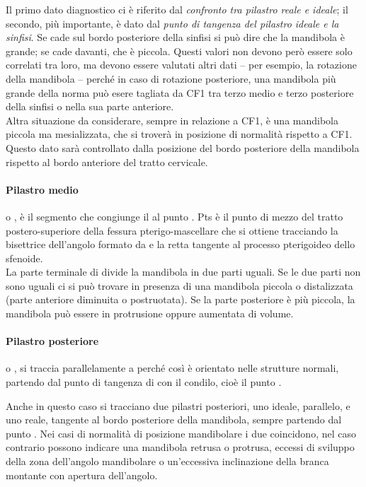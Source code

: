 Il primo dato diagnostico ci è riferito dal \emph{confronto tra pilastro reale e ideale}; il secondo, più importante, è dato dal \emph{punto di tangenza del pilastro ideale e la sinfisi}. Se cade sul bordo posteriore della sinfisi si può dire che la mandibola è grande; se cade davanti, che è piccola. Questi valori non devono però essere solo correlati tra loro, ma devono essere valutati altri dati -- per esempio, la rotazione della mandibola -- perché in caso di rotazione posteriore, una mandibola più grande della norma può esere tagliata da CF1 tra terzo medio e terzo posteriore della sinfisi o nella sua parte anteriore.\\

Altra situazione da considerare, sempre in relazione a CF1, è una mandibola piccola ma mesializzata, che si troverà in posizione di normalità rispetto a CF1. Questo dato sarà controllato dalla posizione del bordo posteriore della mandibola rispetto al bordo anteriore del tratto cervicale.

\paragraph{Pilastro medio} o , è il segmento che congiunge il  al punto . Pts è il punto di mezzo del tratto postero-superiore della fessura pterigo-mascellare che si ottiene tracciando la bisettrice dell'angolo formato da  e la retta tangente al processo pterigoideo dello sfenoide.\\
La parte terminale di  divide la mandibola in due parti uguali. Se le due parti non sono uguali ci si può trovare in presenza di una mandibola piccola o distalizzata (parte anteriore diminuita o postruotata). Se la parte posteriore è più piccola, la mandibola può essere in protrusione oppure aumentata di volume.\\

\paragraph{Pilastro posteriore} o , si traccia parallelamente a  perché così è orientato nelle strutture normali, partendo dal punto di tangenza di  con il condilo, cioè il punto .

Anche in questo caso si tracciano due pilastri posteriori, uno ideale, parallelo, e uno reale, tangente al bordo posteriore della mandibola, sempre partendo dal punto . Nei casi di normalità di posizione mandibolare i due coincidono, nel caso contrario possono indicare una mandibola retrusa o protrusa, eccessi di sviluppo della zona dell'angolo mandibolare o un'eccessiva inclinazione della branca montante con apertura dell'angolo.

